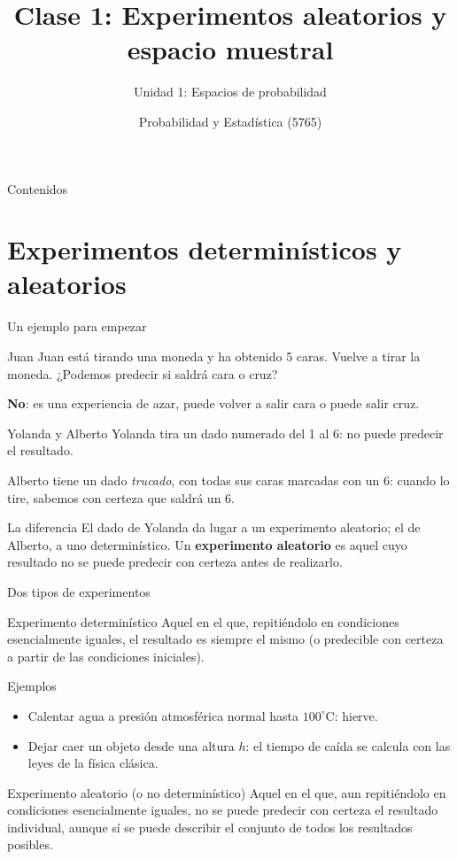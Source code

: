 \documentclass[aspectratio=169,11pt]{beamer}
\title[Prob. y Estadística]{Clase 1: Experimentos aleatorios y espacio muestral}
\subtitle{Unidad 1: Espacios de probabilidad}
\institute[UNS]{Universidad Nacional del Sur \\ Departamento de Matemática}
\author{Probabilidad y Estadística (5765)}
\date{}
\begin{document}
\begin{frame}
\titlepage
\end{frame}

\begin{frame}{Contenidos}
\tableofcontents
\end{frame}

\section{Experimentos determinísticos y aleatorios}

\begin{frame}{Un ejemplo para empezar}
\begin{exampleblock}{Juan}
Juan está tirando una moneda y ha obtenido 5 caras.
Vuelve a tirar la moneda. ¿Podemos predecir si saldrá cara o cruz?

\textbf{No}: es una experiencia de azar, puede volver a salir cara o puede salir cruz.
\end{exampleblock}

\begin{exampleblock}{Yolanda y Alberto}
Yolanda tira un dado numerado del 1 al 6: no puede predecir el resultado.

Alberto tiene un dado \emph{trucado}, con todas sus caras marcadas con un 6: cuando lo tire, sabemos con certeza que saldrá un 6.
\end{exampleblock}

\begin{alertblock}{La diferencia}
El dado de Yolanda da lugar a un experimento aleatorio; el de Alberto, a uno determinístico. Un \textbf{experimento aleatorio} es aquel cuyo resultado no se puede predecir con certeza antes de realizarlo.
\end{alertblock}
\end{frame}

\begin{frame}{Dos tipos de experimentos}
\begin{block}{Experimento determinístico}
Aquel en el que, repitiéndolo en condiciones esencialmente iguales, el resultado es siempre el mismo (o predecible con certeza a partir de las condiciones iniciales).
\end{block}

\begin{exampleblock}{Ejemplos}
\begin{itemize}
\item Calentar agua a presión atmosférica normal hasta $100^\circ$C: hierve.
\item Dejar caer un objeto desde una altura $h$: el tiempo de caída se calcula con las leyes de la física clásica.
\end{itemize}
\end{exampleblock}

\begin{block}{Experimento aleatorio (o no determinístico)}
Aquel en el que, aun repitiéndolo en condiciones esencialmente iguales, no se puede predecir con certeza el resultado individual, aunque sí se puede describir el conjunto de todos los resultados posibles.
\end{block}
\end{frame}
\end{document}
